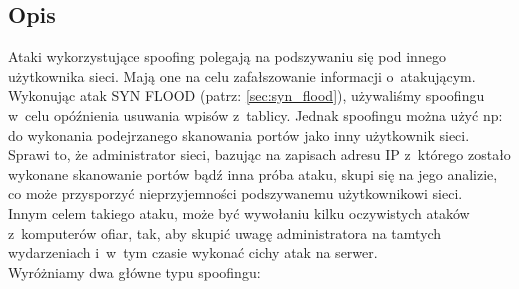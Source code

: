 \documentclass[a4paper,12pt]{book}
\begin{document}
		\subsection{Opis}
			Ataki wykorzystujące spoofing polegają na podszywaniu się pod innego użytkownika sieci.
			Mają one na celu zafałszowanie informacji o~atakującym.\\
			Wykonując atak SYN FLOOD (patrz: \ref{sec:syn_flood}), używaliśmy spoofingu w~celu opóźnienia usuwania wpisów z~tablicy.
			Jednak spoofingu można użyć np: do wykonania podejrzanego skanowania portów jako inny użytkownik sieci.
			Sprawi to, że administrator sieci, bazując na zapisach adresu IP z~którego zostało wykonane skanowanie portów bądź inna próba ataku, skupi się na jego analizie, co może przysporzyć nieprzyjemności podszywanemu użytkownikowi sieci.\\
			Innym celem takiego ataku, może być wywołaniu kilku oczywistych ataków z~komputerów ofiar, tak, aby skupić uwagę administratora na tamtych wydarzeniach i~w~tym czasie wykonać cichy atak na serwer.\\
			Wyróżniamy dwa główne typu spoofingu:
\end{document}
